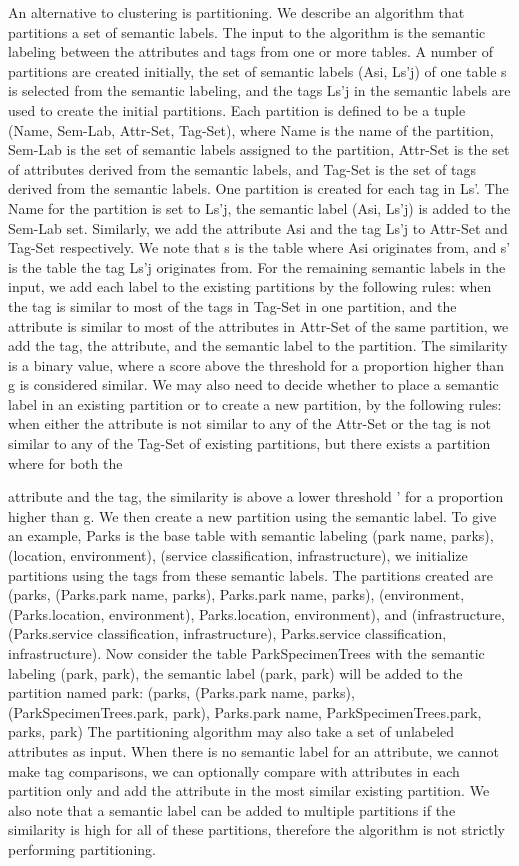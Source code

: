 An alternative to clustering is partitioning. We describe an algorithm that partitions a set of semantic labels. The input to the algorithm is the semantic labeling between the attributes and tags from one or more tables. A number of partitions are created initially, the set of semantic labels (Asi, Ls'j) of one table s is selected from the semantic labeling, and the tags Ls'j in the semantic labels are used to create the initial partitions. Each partition is defined to be a tuple (Name, Sem-Lab, Attr-Set, Tag-Set), where Name is the name of the partition, Sem-Lab is the set of semantic labels assigned to the partition, Attr-Set is the set of attributes derived from the semantic labels, and Tag-Set is the set of tags derived from the semantic labels. One partition is created for each tag in Ls'. The Name for the partition is set to Ls'j, the semantic label (Asi, Ls'j) is added to the Sem-Lab set. Similarly, we add the attribute Asi and the tag Ls'j to Attr-Set and Tag-Set respectively. We note that s is the table where Asi originates from, and s' is the table the tag Ls'j originates from.
For the remaining semantic labels in the input, we add each label to the existing partitions by the following rules: when the tag is similar to most of the tags in Tag-Set in one partition, and the attribute is similar to most of the attributes in Attr-Set of the same partition, we add the tag, the attribute, and the semantic label to the partition. The similarity is a binary value, where a score above the threshold  for a proportion higher than g is considered similar. We may also need to decide whether to place a semantic label in an existing partition or to create a new partition, by the following rules: when either the attribute is not similar to any of the Attr-Set or the tag is not similar to any of the Tag-Set of existing partitions, but there exists a partition where for both the

attribute and the tag, the similarity is above a lower threshold ' for a proportion higher than g. We then create a new partition using the semantic label.
To give an example, Parks is the base table with semantic labeling {(park name, parks), (location, environment), (service classification, infrastructure)}, we initialize partitions using the tags from these semantic labels. The partitions created are
(parks, {(Parks.park name, parks)}, {Parks.park name}, {parks}),
(environment, {(Parks.location, environment)}, {Parks.location}, {environment}), and
(infrastructure, {(Parks.service classification, infrastructure)}, {Parks.service classification}, {infrastructure}).
Now consider the table ParkSpecimenTrees with the semantic labeling {(park, park)}, the semantic label (park, park) will be added to the partition named park:
(parks, {(Parks.park name, parks), (ParkSpecimenTrees.park, park)}, {Parks.park name, ParkSpecimenTrees.park}, {parks, park})
The partitioning algorithm may also take a set of unlabeled attributes as input. When there is no semantic label for an attribute, we cannot make tag comparisons, we can optionally compare with attributes in each partition only and add the attribute in the most similar existing partition. We also note that a semantic label can be added to multiple partitions if the similarity is high for all of these partitions, therefore the algorithm is not strictly performing partitioning.
